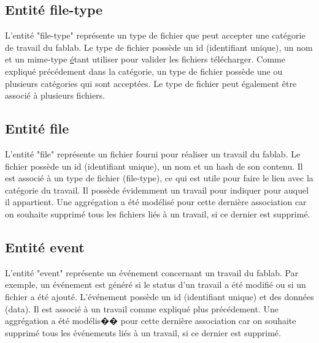 \documentclass[
    iai, %
    il, %
]{heig-tb}
\begin{document}
\subsection{Entité file-type}
L'entité "file-type" représente un type de fichier que peut accepter une catégorie de travail du fablab.\newline
Le type de fichier possède un id (identifiant unique), un nom et un mime-type \href{https://developer.mozilla.org/fr/docs/Web/HTTP/Basics_of_HTTP/MIME_Types} étant utiliser pour valider les fichiers télécharger.\newline
Comme expliqué précédement dans la catégorie, un type de fichier possède une ou plusieurs catégories qui sont acceptées.\newline
Le type de fichier peut également être associé à plusieurs fichiers.

\subsection{Entité file}
L'entité "file" représente un fichier fourni pour réaliser un travail du fablab.\newline
Le fichier possède un id (identifiant unique), un nom et un hash de son contenu.\newline
Il est associé à un type de fichier (file-type), ce qui est utile pour faire le lien avec la catégorie du travail.\newline
Il possède évidemment un travail pour indiquer pour auquel il appartient.\newline
Une aggrégation a été modélisé pour cette dernière association car on souhaite supprimé tous les fichiers liés à un travail, si ce dernier est supprimé.

\subsection{Entité event}
L'entité "event" représente un événement concernant un travail du fablab. Par exemple, un événement est généré si le status d'un travail a été modifié ou si un fichier a été ajouté.\newline
L'événement possède un id (identifiant unique) et des données (data).\newline
Il est associé à un travail comme expliqué plus précédement.\newline
Une aggrégation a été modélis�� pour cette dernière association car on souhaite supprimé tous les événements liés à un travail, si ce dernier est supprimé.
\end{document}
